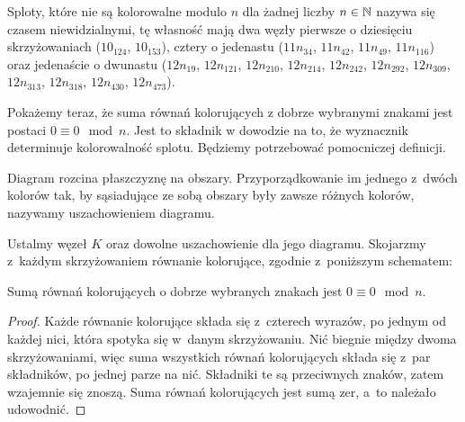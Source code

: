 Sploty, które nie są kolorowalne modulo $n$ dla żadnej liczby $n \in \mathbb N$ nazywa się czasem niewidzialnymi, tę własność mają dwa węzły pierwsze o dziesięciu skrzyżowaniach ($10_{124}$, $10_{153}$), cztery o jedenastu ($11n_{34}$, $11n_{42}$, $11n_{49}$, $11n_{116}$) oraz jedenaście o dwunastu ($12n_{19}$, $12n_{121}$, $12n_{210}$, $12n_{214}$, $12n_{242}$, $12n_{292}$, $12n_{309}$, $12n_{313}$, $12n_{318}$, $12n_{430}$, $12n_{473}$).
%

Pokażemy teraz, że suma równań kolorujących z dobrze wybranymi znakami jest postaci $0 \equiv 0 \mod n$.
Jest to składnik w dowodzie na to, że wyznacznik determinuje kolorowalność splotu.
Będziemy potrzebować pomocniczej definicji.

\begin{definition}[uszachowienie]
%
    Diagram rozcina płaszczyznę na obszary.
    Przyporządkowanie im jednego z~dwóch kolorów tak, by sąsiadujące ze sobą obszary były zawsze różnych kolorów, nazywamy uszachowieniem diagramu.
\end{definition}

Ustalmy węzeł $K$ oraz dowolne uszachowienie dla jego diagramu.
Skojarzmy z~każdym skrzyżowaniem równanie kolorujące, zgodnie z~poniższym schematem:
\begin{comment}
\begin{figure}[H]
    \begin{minipage}[b]{.48\linewidth}
    \[
        \HugeCrossingChessboardA
    \]
    \subcaption{$+a-b+a-c=0 \mod n$}
    \end{minipage}
    \begin{minipage}[b]{.48\linewidth}
    \[
        \HugeCrossingChessboardB
    \]
    \subcaption{$-a+b-a+c=0 \mod n$}
    \end{minipage}
\end{figure}
\end{comment}

\begin{proposition}
\label{prp:colouring_sum_zero}%
    Sumą równań kolorujących o dobrze wybranych znakach jest $0 \equiv 0 \mod n$.
\end{proposition}

\begin{proof}
    Każde równanie kolorujące składa się z~czterech wyrazów, po jednym od każdej nici, która spotyka się w~danym skrzyżowaniu.
    Nić biegnie między dwoma skrzyżowaniami, więc suma wszystkich równań kolorujących składa się z~par składników, po jednej parze na nić.
    Składniki te są przeciwnych znaków, zatem wzajemnie się znoszą.
    Suma równań kolorujących jest sumą zer, a~to należało udowodnić.
\end{proof}


